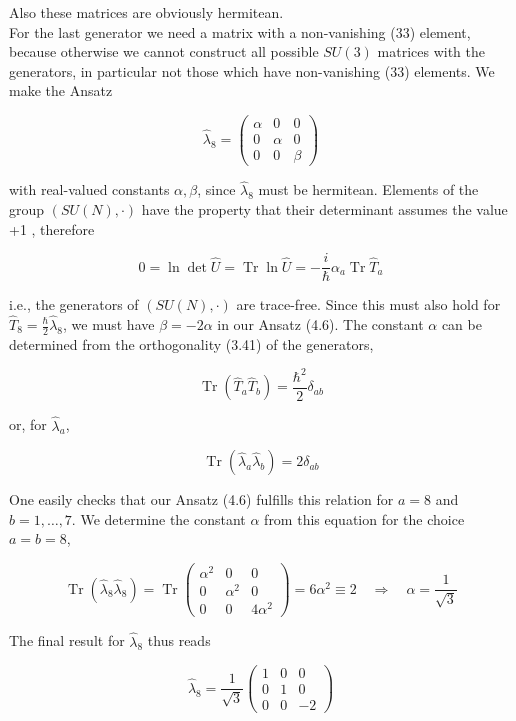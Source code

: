 \documentclass[10pt, letterpaper]{article}
\begin{document}
Also these matrices are obviously hermitean.\\
For the last generator we need a matrix with a non-vanishing (33) element, because otherwise we cannot construct all possible $S U(3)$ matrices with the generators, in particular not those which have non-vanishing (33) elements. We make the Ansatz

$$
\hat{\lambda}_{8}=\left(\begin{array}{ccc}
\alpha & 0 & 0 \\
0 & \alpha & 0 \\
0 & 0 & \beta
\end{array}\right)
$$

with real-valued constants $\alpha, \beta$, since $\hat{\lambda}_{8}$ must be hermitean. Elements of the group $(S U(N), \cdot)$ have the property that their determinant assumes the value +1 , therefore

$$
0=\ln \operatorname{det} \hat{U}=\operatorname{Tr} \ln \hat{U}=-\frac{i}{\hbar} \alpha_{a} \operatorname{Tr} \hat{T}_{a}
$$

i.e., the generators of $(S U(N), \cdot)$ are trace-free. Since this must also hold for $\hat{T}_{8}=\frac{\hbar}{2} \hat{\lambda}_{8}$, we must have $\beta=-2 \alpha$ in our Ansatz (4.6). The constant $\alpha$ can be determined from the orthogonality (3.41) of the generators,

$$
\operatorname{Tr}\left(\hat{T}_{a} \hat{T}_{b}\right)=\frac{\hbar^{2}}{2} \delta_{a b}
$$

or, for $\hat{\lambda}_{a}$,

$$
\operatorname{Tr}\left(\hat{\lambda}_{a} \hat{\lambda}_{b}\right)=2 \delta_{a b}
$$

One easily checks that our Ansatz (4.6) fulfills this relation for $a=8$ and $b=1, \ldots, 7$. We determine the constant $\alpha$ from this equation for the choice $a=b=8$,

$$
\operatorname{Tr}\left(\hat{\lambda}_{8} \hat{\lambda}_{8}\right)=\operatorname{Tr}\left(\begin{array}{ccc}
\alpha^{2} & 0 & 0 \\
0 & \alpha^{2} & 0 \\
0 & 0 & 4 \alpha^{2}
\end{array}\right)=6 \alpha^{2} \equiv 2 \quad \Longrightarrow \quad \alpha=\frac{1}{\sqrt{3}}
$$

The final result for $\hat{\lambda}_{8}$ thus reads

$$
\hat{\lambda}_{8}=\frac{1}{\sqrt{3}}\left(\begin{array}{ccc}
1 & 0 & 0 \\
0 & 1 & 0 \\
0 & 0 & -2
\end{array}\right)
$$
\end{document}
